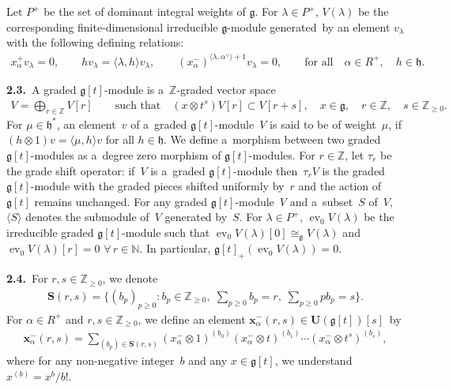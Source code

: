 \documentclass[11pt]{article}
\DeclareMathOperator{\ev}{ev}
\numberwithin{equation}{section}
\begin{document}
Let $P^{+}$ be the set of dominant integral weights of $\mathfrak{g}$.
For $\lambda\in P^+$, $V(\lambda)$ be the corresponding f\/inite-dimensional irreducible $\mathfrak{g}$-module generated~by
an element $v_{\lambda}$ with the following def\/ining relations:
\begin{gather*}
x^{+}_{\alpha}v_\lambda=0,
\qquad
h v_\lambda = \langle \lambda, h \rangle v_\lambda,
\qquad
(x^{-}_{\alpha})^{\langle \lambda, \alpha^{\vee} \rangle +1}  v_\lambda=0,
\qquad
\text{for all}
\quad
\alpha\in R^+,
\quad
h\in\mathfrak{h}.
\end{gather*}

{\bf 2.3.}~A graded $\mathfrak{g}[t]$-module is a~$\mathbb{Z}$-graded vector space
\begin{gather*}
V=\bigoplus_{r\in\mathbb{Z}} V[r] \qquad
\text{such that}
\quad
(x\otimes t^s) V[r]\subset V[r+s],
\quad
x\in\mathfrak{g},
\quad
r\in\mathbb{Z},
\quad
s\in\mathbb{Z}_{\geq0}.
\end{gather*}
For $\mu\in\mathfrak{h}^*$, an element~$v$ of a~graded $\mathfrak{g}[t]$-module~$V$ is said to be of weight~$\mu$, if
$(h\otimes 1)v=\langle \mu, h\rangle v$ for all $h\in \mathfrak{h}$.
We def\/ine a~morphism between two graded $\mathfrak{g}[t]$-modules as a~degree zero morphism of
$\mathfrak{g}[t]$-modules.
For $r\in\mathbb{Z}$, let $\tau_r$ be the grade shift operator: if~$V$ is a~graded $\mathfrak{g}[t]$-module then~$\tau_r
V$ is the graded $\mathfrak{g}[t]$-module with the graded pieces shifted uniformly by~$r$ and the action of~$\mathfrak{g}[t]$ remains unchanged.
For any graded $\mathfrak{g}[t]$-module~$V$ and a~subset~$S$ of~$V$, $\langle S\rangle$ denotes the submodule of~$V$ generated by~$S$.
For $\lambda\in P^+$, $\ev_0 V(\lambda)$ be the irreducible graded $\mathfrak{g}[t]$-module such
that $\ev_0 V(\lambda)[0]\cong_{\mathfrak{g}} V(\lambda)$ and $\ev_0 V(\lambda)[r]=0$
$\forall\, r\in \mathbb{N}$.
In particular, $\mathfrak{g}[t]_{+}(\ev_0 V(\lambda))=0$.

{\bf 2.4.}~For $r,s\in\mathbb{Z}_{\geq0}$, we denote
\begin{gather*}
\mathbf{S}(r,s)=\bigg\{(b_p)_{p\geq0}: b_p\in\mathbb{Z}_{\geq0},
\;
\sum\limits_{p\geq 0}b_p =r,
\;
\sum\limits_{p\geq0}pb_p=s\bigg\}.
\end{gather*}
For $\alpha\in R^{+}$ and $r,s\in\mathbb{Z}_{\geq0}$, we def\/ine an element
$\mathbf{x}^{-}_{\alpha}(r,s)\in\mathbf{U}(\mathfrak{g}[t])[s]$~by
\begin{gather*}
\mathbf{x}^{-}_{\alpha}(r,s)=\sum\limits_{(b_p)\in\mathbf{S}(r,s)} (x^{-}_{\alpha} \otimes 1)^{(b_0)}(x^{-}_{\alpha}
\otimes t)^{(b_1)}\cdots(x^{-}_{\alpha} \otimes t^s)^{(b_s)},
\end{gather*}
where for any non-negative integer~$b$ and any $x\in\mathfrak{g}[t]$, we understand
$x^{(b)}=x^b/b!$.
\end{document}
